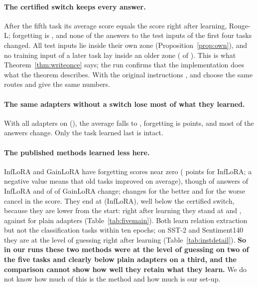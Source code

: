 \paragraph{The certified switch keeps every answer.} After the fifth task its average score equals the
score right after learning, \FiveCertAP{} Rouge-L; forgetting is \FiveCertFT{}, and none of
the \FiveCertCompared{} answers to the test inputs of the first four tasks changed. All \FiveCertInputsOne{} test inputs lie inside
their own zone (Proposition~\ref{prop:own}), and no training input of a later
task lay inside an older zone (\FiveCertBlocked{} of \FiveCertTrainInputs{}). This is what Theorem~\ref{thm:writeonce} says; the run confirms that the implementation does what the theorem describes. With the original instructions
\nearest{}, \centre{} and \keyswitch{} choose the same routes and give the same numbers.

\paragraph{The same adapters without a switch lose most of what they learned.} With all adapters on (\plain{}), the average falls to
\FivePlainAP{}, forgetting is \FivePlainFT{} points, and most of the
\FivePlainCompared{} answers change. Only the task learned last is intact.

\paragraph{The published methods learned less here.} InfLoRA and GainLoRA have forgetting scores near zero (\FiveInfFT{} points for InfLoRA; a
negative value means that old tasks improved on average), though \FiveInfChanged{} of \FiveInfCompared{} answers of InfLoRA and \FiveGainChanged{} of \FiveGainCompared{} of GainLoRA change; changes for the better and for the worse cancel in the score. They end at \FiveInfAP{} (InfLoRA),
well below the certified switch, because they are lower from the start: right
after learning they stand at \FiveInfLearned{} and \FiveGainLearned{}, against
\FivePlainLearned{} for plain adapters (Table~\ref{tab:fivemain}). Both learn relation extraction but not the classification tasks within ten epochs; on SST-2 and Sentiment140 they are at the level of guessing right after learning (Table~\ref{tab:instdetail}). \textbf{So in our runs these two methods were at the level of guessing on two of the five tasks and clearly below plain adapters on a third, and the comparison cannot show how well they retain what they learn.} We do not know how much of this is the method and how much is our set-up.

